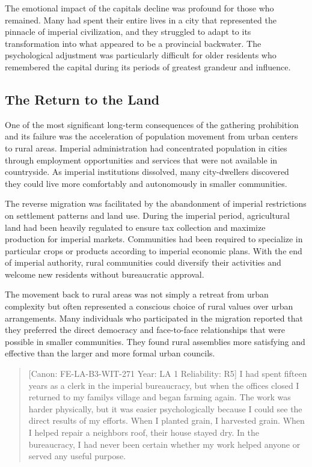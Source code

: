 The emotional impact of the capital\textquotesingle s decline was
profound for those who remained. Many had spent their entire lives in a
city that represented the pinnacle of imperial civilization, and they
struggled to adapt to its transformation into what appeared to be a
provincial backwater. The psychological adjustment was particularly
difficult for older residents who remembered the capital during its
periods of greatest grandeur and influence.

\subsection{The Return to the Land}\label{the-return-to-the-land}

One of the most significant long-term consequences of the gathering
prohibition and its failure was the acceleration of population movement
from urban centers to rural areas. Imperial administration had
concentrated population in cities through employment opportunities and
services that were not available in countryside. As imperial
institutions dissolved, many city-dwellers discovered they could live
more comfortably and autonomously in smaller communities.

The reverse migration was facilitated by the abandonment of imperial
restrictions on settlement patterns and land use. During the imperial
period, agricultural land had been heavily regulated to ensure tax
collection and maximize production for imperial markets. Communities had
been required to specialize in particular crops or products according to
imperial economic plans. With the end of imperial authority, rural
communities could diversify their activities and welcome new residents
without bureaucratic approval.

The movement back to rural areas was not simply a retreat from urban
complexity but often represented a conscious choice of rural values over
urban arrangements. Many individuals who participated in the migration
reported that they preferred the direct democracy and face-to-face
relationships that were possible in smaller communities. They found
rural assemblies more satisfying and effective than the larger and more
formal urban councils.

\begin{quote}
{[}Canon: FE-LA-B3-WIT-271 \textbar{} Year: LA 1 \textbar{} Reliability:
R5{]} I had spent fifteen years as a clerk in the imperial bureaucracy,
but when the offices closed I returned to my family\textquotesingle s
village and began farming again. The work was harder physically, but it
was easier psychologically because I could see the direct results of my
efforts. When I planted grain, I harvested grain. When I helped repair a
neighbor\textquotesingle s roof, their house stayed dry. In the
bureaucracy, I had never been certain whether my work helped anyone or
served any useful purpose.
\end{quote}

